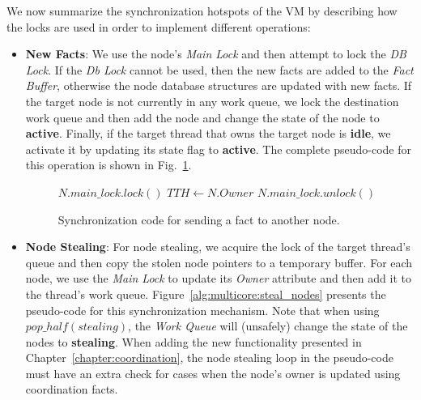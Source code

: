 
We now summarize the synchronization hotspots of the VM by describing how the locks
are used in order to implement different operations:

\begin{itemize}

   \item \textbf{New Facts}: We use the node's \emph{Main Lock} and then attempt
      to lock the \emph{DB Lock}. If the \emph{Db Lock} cannot be used, then the
      new facts are added to the \emph{Fact Buffer}, otherwise the node database
      structures are updated with new facts. If the target node is not currently
      in any work queue, we lock the destination work queue and then add the
      node and change the state of the node to \textbf{active}. Finally, if the
      target thread that owns the target node is \textbf{idle}, we activate it
      by updating its state flag to \textbf{active}. The complete pseudo-code
      for this operation is shown in Fig.~\ref{alg:multicore:new_fact}.

\begin{figure}
\begin{algorithm}[H]
   $N.main\_lock.lock()$\;
   $TTH \longleftarrow N.Owner$\;
   $N.main\_lock.unlock()$\;
\end{algorithm}
\caption{Synchronization code for sending a fact to another node.}
 \label{alg:multicore:new_fact}
\end{figure}


   \item \textbf{Node Stealing}: For node stealing, we acquire the lock of the
      target thread's queue and then copy the stolen node pointers to a
      temporary buffer. For each node, we use the \emph{Main Lock} to update its
      \emph{Owner} attribute and then add it to the thread's work queue.
      Figure~\ref{alg:multicore:steal_nodes} presents the pseudo-code for this
      synchronization mechanism. Note that when using $pop\_half(stealing)$, the
      \emph{Work Queue} will (unsafely) change the state of the nodes to
      \textbf{stealing}. When adding the new functionality presented in
      Chapter~\ref{chapter:coordination}, the node stealing loop in the
      pseudo-code must have an extra check for cases when the node's owner
      is updated using coordination facts.


\end{itemize}

